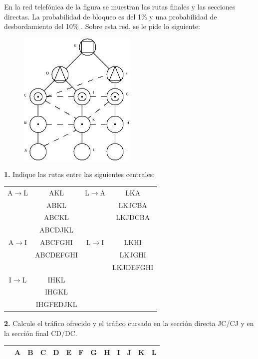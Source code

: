 \begin{exercise}[9]
En la red telefónica de la figura se muestran las rutas finales y las secciones directas. La probabilidad de bloqueo es del 1\% y una probabilidad de desbordamiento del 10\% . Sobre esta red, se le pide lo siguiente:
\begin{figure}[H]
\centering
\includegraphics[width=0.5\textwidth]{Imagen/ejercicio9tema1.jpg}
\label{}
\end{figure}
\textbf{1.} Indique las rutas entre las siguientes centrales:\\
\begin{center}
\begin{tabular}{c c c c}
A$\to$L & AKL  		& L$\to$A 	& LKA 	\\
 		& ABKL		&			& LKJCBA	\\
 		& ABCKL		&			& LKJDCBA	\\
 		& ABCDJKL	&			& 	\\
A$\to$I & ABCFGHI  	& L$\to$I 	& LKHI 	\\
 		& ABCDEFGHI	&			& LKJGHI	\\
 		& 			&			& LKJDEFGHI	\\
I$\to$L & IHKL  	& 		 	&  	\\
 		& IHGKL		&			& 	\\
 		& IHGFEDJKL	&			& 	\\
\end{tabular}
\end{center}
\textbf{2.} Calcule el tráfico ofrecido y el tráfico cursado en la sección directa JC/CJ y en la sección final CD/DC.\\
\begin{center}
\begin{tabular}{| c | c | c | c | c | c | c | c | c | c | c | c | c |}
\hline
   & A & B  & C  & D  & E  & F  & G & H  & I  & J  & K  & L \\\hline

\end{tabular}
\end{center}
\end{exercise}
